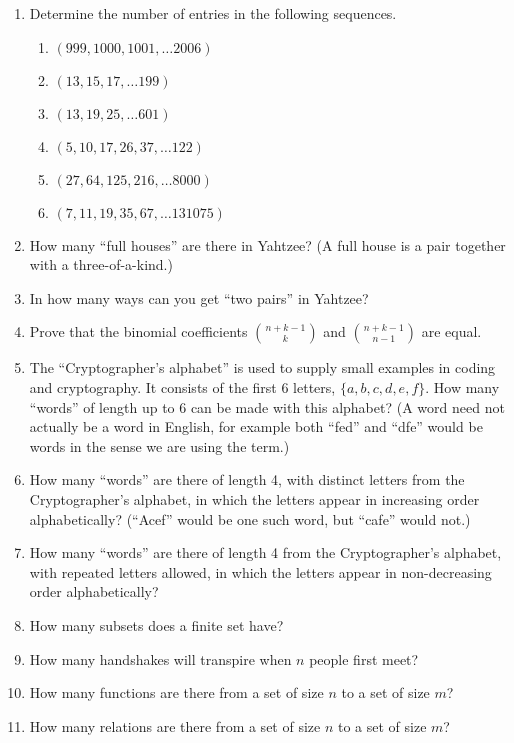 \begin{enumerate}
\item Determine the number of entries in the following sequences.

  \begin{enumerate}
  \item $(999, 1000, 1001, \ldots  2006)$
  \item $(13, 15, 17, \ldots 199)$
  \item $(13, 19, 25, \ldots 601)$
  \item $(5, 10, 17, 26, 37, \ldots 122)$
  \item $(27, 64, 125, 216, \ldots 8000)$
  \item $(7, 11, 19, 35, 67, \ldots 131075)$
  \end{enumerate}

\item How many ``full houses'' are there in Yahtzee?  (A full house is a pair
together with a three-of-a-kind.)

\item In how many ways can you get ``two pairs'' in Yahtzee?

\item Prove that the binomial coefficients $\displaystyle \binom{n+k-1}{k}$
and $\displaystyle \binom{n+k-1}{n-1}$ are equal.

\item The ``Cryptographer's alphabet'' is used to supply small examples
in coding and cryptography.  It consists of the first 6 letters, $\{a, b, c, d, e, f\}$.  How many ``words'' of length up to 6 can be made with this 
alphabet?  (A word need not actually be a word in English, for example 
both ``fed'' and ``dfe'' would be words in the sense we are using the term.)

\item How many ``words'' are there of length 4, with distinct letters from the 
Cryptographer's alphabet, in which the letters appear in increasing order 
alphabetically?  (``Acef'' would be one such word, but ``cafe'' would not.)

\item How many ``words'' are there of length 4 from the 
Cryptographer's alphabet, with repeated letters allowed,
 in which the letters appear in non-decreasing order alphabetically?


\item How many subsets does a finite set have?

\item How many handshakes will transpire when $n$ people first meet?

\item How many functions are there from a set of size $n$ to a set of size $m$?

\item How many relations are there from a set of size $n$ to a set of size $m$?

\end{enumerate}


